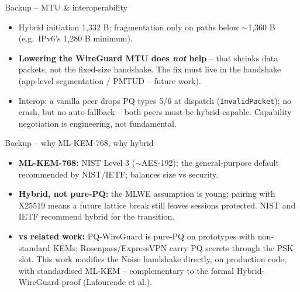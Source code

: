 \documentclass[aspectratio=169,11pt]{beamer}
\begin{document}
\begin{frame}{Backup -- MTU \& interoperability}
  \begin{itemize}
    \item Hybrid initiation 1{,}332 B; fragmentation only on paths below
          $\sim$1{,}360 B (e.g.\ IPv6's 1{,}280 B minimum).
    \item \textbf{Lowering the WireGuard MTU does \emph{not} help} -- that shrinks
          data packets, not the fixed-size handshake. The fix must live in the
          handshake (app-level segmentation / PMTUD -- future work).
    \item Interop: a vanilla peer drops PQ types 5/6 at dispatch
          (\texttt{InvalidPacket}); no crash, but no auto-fallback -- both peers
          must be hybrid-capable. Capability negotiation is engineering, not
          fundamental.
  \end{itemize}
\end{frame}

\begin{frame}{Backup -- why ML-KEM-768, why hybrid}
  \begin{itemize}
    \item \textbf{ML-KEM-768:} NIST Level 3 ($\sim$AES-192); the general-purpose
          default recommended by NIST/IETF; balances size vs security.
    \item \textbf{Hybrid, not pure-PQ:} the MLWE assumption is young; pairing with
          X25519 means a future lattice break still leaves sessions protected.
          NIST and IETF recommend hybrid for the transition.
    \item \textbf{vs related work:} PQ-WireGuard is pure-PQ on prototypes with
          non-standard KEMs; Rosenpass/ExpressVPN carry PQ secrets through the PSK
          slot. This work modifies the Noise handshake directly, on production
          code, with standardised ML-KEM -- complementary to the formal
          Hybrid-WireGuard proof (Lafourcade et al.).
  \end{itemize}
\end{frame}
\end{document}

